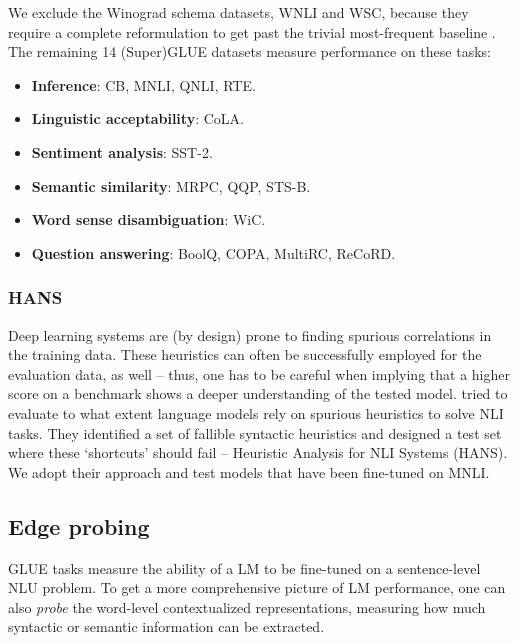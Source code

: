     We exclude the Winograd schema datasets, WNLI and WSC, because they require a complete reformulation to get past the trivial most-frequent baseline \citep{kocijan-etal-2019-surprisingly}. The remaining 14 (Super)GLUE datasets measure performance on these tasks: %

    \begin{itemize}\itemsep0em 
    \item \textbf{Inference}: CB, MNLI, QNLI, RTE.
    \item \textbf{Linguistic acceptability}: CoLA.
    \item \textbf{Sentiment analysis}: SST-2.
    \item \textbf{Semantic similarity}: MRPC, QQP, STS-B.
    \item \textbf{Word sense disambiguation}: WiC.
    \item \textbf{Question answering}: BoolQ, COPA, MultiRC, ReCoRD.
    \end{itemize}

    
    \subsubsection{HANS}
    Deep learning systems are (by design) prone to finding spurious correlations in the training data.
    These heuristics can often be successfully employed for the evaluation data, as well -- thus, one has to be careful when implying that a higher score on a benchmark shows a deeper understanding of the tested model.
     tried to evaluate to what extent language models rely on spurious heuristics to solve NLI tasks. They identified a set of fallible syntactic heuristics and designed a test set where these `shortcuts' should fail -- Heuristic Analysis for NLI Systems (HANS). We adopt their approach and test models that have been fine-tuned on MNLI.
    
    
    \subsection{Edge probing}
    GLUE tasks measure the ability of a LM to be fine-tuned on a sentence-level NLU problem. To get a more comprehensive picture of LM performance, one can also \textit{probe} the word-level contextualized representations, measuring how much syntactic or semantic information can be extracted.


